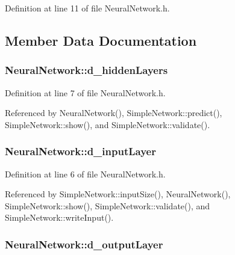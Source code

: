 Definition at line 11 of file NeuralNetwork.h.



\subsection{Member Data Documentation}
\hypertarget{class_neural_network_ae47be9819644d8ecf23328cf4e8f6dfb}{
\subsubsection[{d\_\-hiddenLayers}]{ {\bf NeuralNetwork::d\_\-hiddenLayers}}}
\label{class_neural_network_ae47be9819644d8ecf23328cf4e8f6dfb}


Definition at line 7 of file NeuralNetwork.h.



Referenced by NeuralNetwork(), SimpleNetwork::predict(), SimpleNetwork::show(), and SimpleNetwork::validate().

\hypertarget{class_neural_network_ada358911107a3a4cdccf0812d876393f}{
\subsubsection[{d\_\-inputLayer}]{ {\bf NeuralNetwork::d\_\-inputLayer}}}
\label{class_neural_network_ada358911107a3a4cdccf0812d876393f}


Definition at line 6 of file NeuralNetwork.h.



Referenced by SimpleNetwork::inputSize(), NeuralNetwork(), SimpleNetwork::show(), SimpleNetwork::validate(), and SimpleNetwork::writeInput().

\hypertarget{class_neural_network_af61fb83fcaaf81c5fa0574f7d3bdc268}{
\subsubsection[{d\_\-outputLayer}]{ {\bf NeuralNetwork::d\_\-outputLayer}}}
\label{class_neural_network_af61fb83fcaaf81c5fa0574f7d3bdc268}


